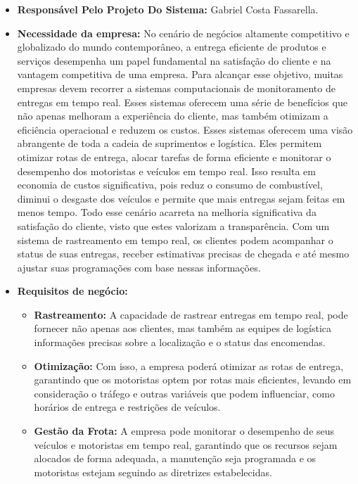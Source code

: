 \begin{itemize}
	\item \textbf{Responsável Pelo Projeto Do Sistema:} Gabriel Costa Fassarella.
	
	\item \textbf{Necessidade da empresa:} No cenário de negócios altamente competitivo e globalizado do mundo contemporâneo, a entrega eficiente de produtos e serviços desempenha um papel fundamental na satisfação do cliente e na vantagem competitiva de uma empresa. Para alcançar esse objetivo, muitas empresas devem recorrer a sistemas computacionais de monitoramento de entregas em tempo real. Esses sistemas oferecem uma série de benefícios que não apenas melhoram a experiência do cliente, mas também otimizam a eficiência operacional e reduzem os custos. Esses sistemas oferecem uma visão abrangente de toda a cadeia de suprimentos e logística. Eles permitem otimizar rotas de entrega, alocar tarefas de forma eficiente e monitorar o desempenho dos motoristas e veículos em tempo real. Isso resulta em economia de custos significativa, pois reduz o consumo de combustível, diminui o desgaste dos veículos e permite que mais entregas sejam feitas em menos tempo. Todo esse cenário acarreta na melhoria significativa da satisfação do cliente, visto que estes valorizam a transparência. Com um sistema de rastreamento em tempo real, os clientes podem acompanhar o status de suas entregas, receber estimativas precisas de chegada e até mesmo ajustar suas programações com base nessas informações.  
	
	\item \textbf{Requisitos de negócio:} 
	\begin{itemize}
		\item \textbf{Rastreamento:} A capacidade de rastrear entregas em tempo real, pode fornecer não apenas aos clientes, mas também as equipes de logística informações precisas sobre a localização e o status das encomendas.
		
		\item \textbf{Otimização:} Com isso, a empresa poderá otimizar as rotas de entrega, garantindo que os motoristas optem por rotas mais eficientes, levando em consideração o tráfego e outras variáveis que podem influenciar, como horários de entrega e restrições de veículos.
		
		\item \textbf{Gestão da Frota:} A empresa pode monitorar o desempenho de seus veículos e motoristas em tempo real, garantindo que os recursos sejam alocados de forma adequada, a manutenção seja programada e os motoristas estejam seguindo as diretrizes estabelecidas.
	\end{itemize}


\end{itemize}
